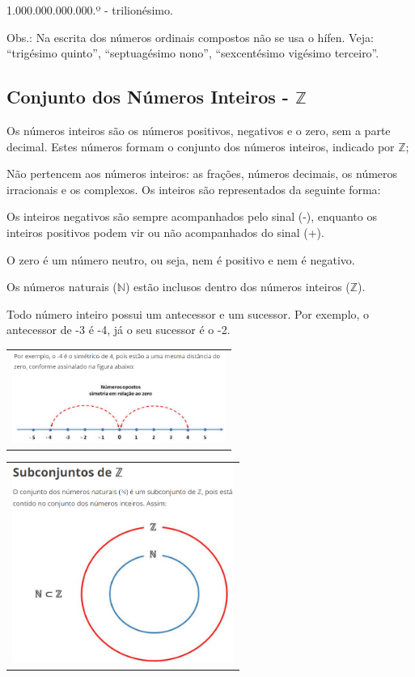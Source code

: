 \begin{multicols*}{2}
\begin{enumerate}
1.000.000.000.000.º - trilionésimo.

Obs.: Na escrita dos números ordinais compostos não se usa o hífen. Veja: “trigésimo quinto”, “septuagésimo nono”, “sexcentésimo vigésimo terceiro”.

		\end{enumerate}
			
		\subsection{Conjunto dos Números Inteiros - $\mathbb{Z}$}
	
	Os números inteiros são os números positivos, negativos e o zero, sem a parte decimal. Estes números formam o conjunto dos números inteiros, indicado por $\mathbb{Z}$;
	
	Não pertencem aos números inteiros: as frações, números decimais, os números irracionais e os complexos. Os inteiros são representados da seguinte forma:
	
	
	Os inteiros negativos são sempre acompanhados pelo sinal (-), enquanto os inteiros positivos podem vir ou não acompanhados do sinal (+).

O zero é um número neutro, ou seja, nem é positivo e nem é negativo.

Os números naturais ($\mathbb{N}$) estão inclusos dentro dos números inteiros ($\mathbb{Z}$).

Todo número inteiro possui um antecessor e um sucessor. Por exemplo, o antecessor de -3 é -4, já o seu sucessor é o -2.\\

\begin{tabular}{@{}c@{}}
	\includegraphics[height=30mm]{assets/Reta Conjunto dos Inteiros.png}
\end{tabular}


\begin{tabular}{@{}c@{}}
	\includegraphics[height=65mm]{assets/Conjunto dos Inteiros Mais os Naturais Nele Contido.png}
\end{tabular}
		

\end{multicols*}

